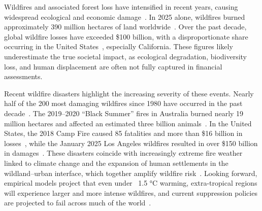 \documentclass[pdflatex,sn-mathphys-num]{sn-jnl}%
\theoremstyle{thmstyleone}%
\theoremstyle{thmstyletwo}%
\theoremstyle{thmstylethree}%
\begin{document}
\noindent Wildfires and associated forest loss have intensified in recent years, causing widespread ecological and economic damage~\citep{curtis2018classifying, tyukavina2022global, hu2025coexposure}. In 2025 alone, wildfires burned approximately 390 million hectares of land worldwide~\citep{GAR2025}. Over the past decade, global wildfire losses have exceeded \$100 billion, with a disproportionate share occurring in the United States~\citep{GAR2025}, especially California. These figures likely underestimate the true societal impact, as ecological degradation, biodiversity loss, and human displacement are often not fully captured in financial assessments.


Recent wildfire disasters highlight the increasing severity of these events. Nearly half of the 200 most damaging wildfires since 1980 have occurred in the past decade~\citep{science25}. The 2019–2020 ``Black Summer'' fires in Australia burned nearly 19 million hectares and affected an estimated three billion animals~\citep{nhra2023blacksummer,ward2020biodiversity}. In the United States, the 2018 Camp Fire caused 85 fatalities and more than \$16 billion in losses~\citep{hamideh2022wildfire}, while the January 2025 Los Angeles wildfires resulted in over \$150 billion in damages~\citep{calfire2025deadliest,laedc2025wildfires}. These disasters coincide with increasingly extreme fire weather linked to climate change and the expansion of human settlements in the wildland–urban interface, which together amplify wildfire risk~\citep{science25}. Looking forward, empirical models project that even under ~1.5 °C warming, extra-tropical regions will experience larger and more intense wildfires, and current suppression policies are projected to fail across much of the world~\cite{haas2026wildfires}.
\end{document}
